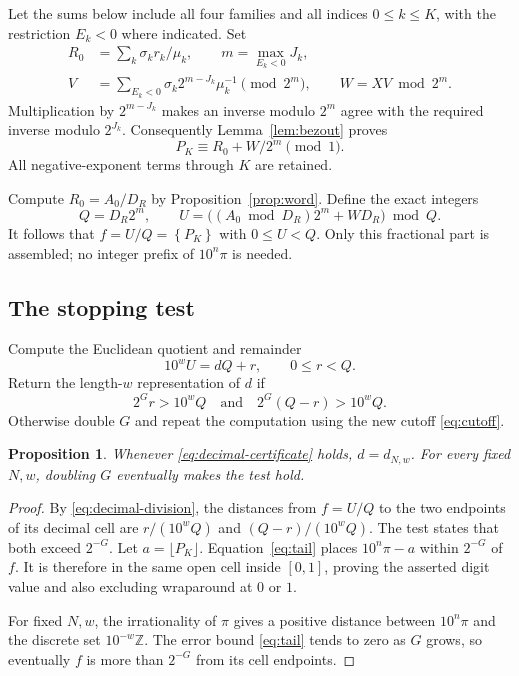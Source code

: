 \documentclass[11pt]{article}
\numberwithin{equation}{section}
\newtheorem{proposition}[theorem]{Proposition}
\theoremstyle{definition}
\newcommand{\Z}{\mathbb Z}
\newcommand{\fracpart}[1]{\left\{#1\right\}}
\begin{document}
Let the sums below include all four families and all indices
$0\le k\le K$, with the restriction $E_k<0$ where indicated.
Set
\begin{equation}\label{eq:RV}
 \begin{split}
 R_0&=\sum_k\sigma_k r_k/\mu_k,\qquad
 m=\max_{E_k<0}J_k,\\
 V&=\sum_{E_k<0}\sigma_k2^{m-J_k}\mu_k^{-1}\pmod{2^m},
 \qquad W=XV\bmod2^m .
 \end{split}
\end{equation}
Multiplication by $2^{m-J_k}$ makes an inverse modulo
$2^m$ agree with the required inverse modulo $2^{J_k}$.
Consequently Lemma~\ref{lem:bezout} proves
\begin{equation}\label{eq:fractional-consolidation}
 P_K\equiv R_0+W/2^m\pmod1 .
\end{equation}
All negative-exponent terms through $K$ are retained.

Compute $R_0=A_0/D_R$ by Proposition~\ref{prop:word}.
Define the exact integers
\begin{equation}\label{eq:UQ}
 Q=D_R2^m,\qquad
 U=\bigl((A_0\bmod D_R)2^m+WD_R\bigr)\bmod Q.
\end{equation}
It follows that $f=U/Q=\fracpart{P_K}$ with $0\le U<Q$.
Only this fractional part is assembled; no integer prefix of
$10^n\pi$ is needed.

\subsection{The stopping test}

Compute the Euclidean quotient and remainder
\begin{equation}\label{eq:decimal-division}
 10^wU=dQ+r,\qquad 0\le r<Q .
\end{equation}
Return the length-$w$ representation of $d$ if
\begin{equation}\label{eq:decimal-certificate}
 2^G r>10^w Q
 \quad\text{and}\quad
 2^G(Q-r)>10^w Q.
\end{equation}
Otherwise double $G$ and repeat the computation using the
new cutoff \eqref{eq:cutoff}.

\begin{proposition}\label{prop:certificate}
Whenever \eqref{eq:decimal-certificate} holds, $d=d_{N,w}$.
For every fixed $N,w$, doubling $G$ eventually makes the
test hold.
\end{proposition}

\begin{proof}
By \eqref{eq:decimal-division}, the distances from $f=U/Q$
to the two endpoints of its decimal cell are
$r/(10^wQ)$ and $(Q-r)/(10^wQ)$.
The test states that both exceed $2^{-G}$.
Let $a=\lfloor P_K\rfloor$. Equation~\eqref{eq:tail}
places $10^n\pi-a$ within $2^{-G}$ of $f$.
It is therefore in the same open cell inside $[0,1]$,
proving the asserted digit value and also excluding wraparound
at $0$ or $1$.

For fixed $N,w$, the irrationality of $\pi$ gives a positive
distance between $10^n\pi$ and the discrete set
$10^{-w}\Z$. The error bound \eqref{eq:tail} tends to zero
as $G$ grows, so eventually $f$ is more than $2^{-G}$
from its cell endpoints.
\end{proof}
\end{document}
